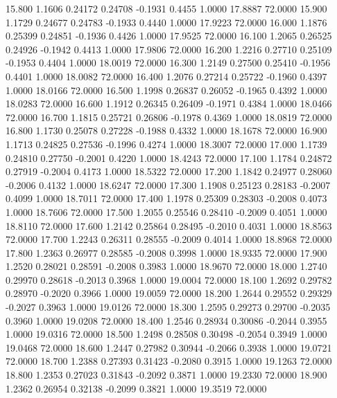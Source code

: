   15.800   1.1606   0.24172   0.24708  -0.1931   0.4455   1.0000  17.8887  72.0000
  15.900   1.1729   0.24677   0.24783  -0.1933   0.4440   1.0000  17.9223  72.0000
  16.000   1.1876   0.25399   0.24851  -0.1936   0.4426   1.0000  17.9525  72.0000
  16.100   1.2065   0.26525   0.24926  -0.1942   0.4413   1.0000  17.9806  72.0000
  16.200   1.2216   0.27710   0.25109  -0.1953   0.4404   1.0000  18.0019  72.0000
  16.300   1.2149   0.27500   0.25410  -0.1956   0.4401   1.0000  18.0082  72.0000
  16.400   1.2076   0.27214   0.25722  -0.1960   0.4397   1.0000  18.0166  72.0000
  16.500   1.1998   0.26837   0.26052  -0.1965   0.4392   1.0000  18.0283  72.0000
  16.600   1.1912   0.26345   0.26409  -0.1971   0.4384   1.0000  18.0466  72.0000
  16.700   1.1815   0.25721   0.26806  -0.1978   0.4369   1.0000  18.0819  72.0000
  16.800   1.1730   0.25078   0.27228  -0.1988   0.4332   1.0000  18.1678  72.0000
  16.900   1.1713   0.24825   0.27536  -0.1996   0.4274   1.0000  18.3007  72.0000
  17.000   1.1739   0.24810   0.27750  -0.2001   0.4220   1.0000  18.4243  72.0000
  17.100   1.1784   0.24872   0.27919  -0.2004   0.4173   1.0000  18.5322  72.0000
  17.200   1.1842   0.24977   0.28060  -0.2006   0.4132   1.0000  18.6247  72.0000
  17.300   1.1908   0.25123   0.28183  -0.2007   0.4099   1.0000  18.7011  72.0000
  17.400   1.1978   0.25309   0.28303  -0.2008   0.4073   1.0000  18.7606  72.0000
  17.500   1.2055   0.25546   0.28410  -0.2009   0.4051   1.0000  18.8110  72.0000
  17.600   1.2142   0.25864   0.28495  -0.2010   0.4031   1.0000  18.8563  72.0000
  17.700   1.2243   0.26311   0.28555  -0.2009   0.4014   1.0000  18.8968  72.0000
  17.800   1.2363   0.26977   0.28585  -0.2008   0.3998   1.0000  18.9335  72.0000
  17.900   1.2520   0.28021   0.28591  -0.2008   0.3983   1.0000  18.9670  72.0000
  18.000   1.2740   0.29970   0.28618  -0.2013   0.3968   1.0000  19.0004  72.0000
  18.100   1.2692   0.29782   0.28970  -0.2020   0.3966   1.0000  19.0059  72.0000
  18.200   1.2644   0.29552   0.29329  -0.2027   0.3963   1.0000  19.0126  72.0000
  18.300   1.2595   0.29273   0.29700  -0.2035   0.3960   1.0000  19.0208  72.0000
  18.400   1.2546   0.28934   0.30086  -0.2044   0.3955   1.0000  19.0316  72.0000
  18.500   1.2498   0.28508   0.30498  -0.2054   0.3949   1.0000  19.0468  72.0000
  18.600   1.2447   0.27982   0.30944  -0.2066   0.3938   1.0000  19.0721  72.0000
  18.700   1.2388   0.27393   0.31423  -0.2080   0.3915   1.0000  19.1263  72.0000
  18.800   1.2353   0.27023   0.31843  -0.2092   0.3871   1.0000  19.2330  72.0000
  18.900   1.2362   0.26954   0.32138  -0.2099   0.3821   1.0000  19.3519  72.0000

